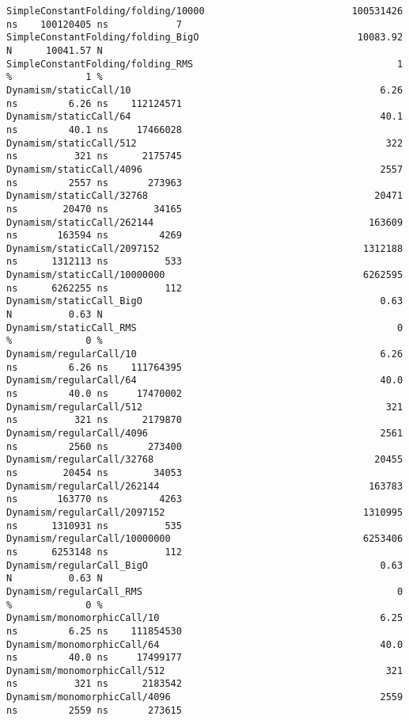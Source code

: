 \begin{code}
\begin{verbatim}
SimpleConstantFolding/folding/10000                          100531426 ns    100120405 ns            7
SimpleConstantFolding/folding_BigO                            10083.92 N      10041.57 N
SimpleConstantFolding/folding_RMS                                    1 %             1 %
Dynamism/staticCall/10                                            6.26 ns         6.26 ns    112124571
Dynamism/staticCall/64                                            40.1 ns         40.1 ns     17466028
Dynamism/staticCall/512                                            322 ns          321 ns      2175745
Dynamism/staticCall/4096                                          2557 ns         2557 ns       273963
Dynamism/staticCall/32768                                        20471 ns        20470 ns        34165
Dynamism/staticCall/262144                                      163609 ns       163594 ns         4269
Dynamism/staticCall/2097152                                    1312188 ns      1312113 ns          533
Dynamism/staticCall/10000000                                   6262595 ns      6262255 ns          112
Dynamism/staticCall_BigO                                          0.63 N          0.63 N
Dynamism/staticCall_RMS                                              0 %             0 %
Dynamism/regularCall/10                                           6.26 ns         6.26 ns    111764395
Dynamism/regularCall/64                                           40.0 ns         40.0 ns     17470002
Dynamism/regularCall/512                                           321 ns          321 ns      2179870
Dynamism/regularCall/4096                                         2561 ns         2560 ns       273400
Dynamism/regularCall/32768                                       20455 ns        20454 ns        34053
Dynamism/regularCall/262144                                     163783 ns       163770 ns         4263
Dynamism/regularCall/2097152                                   1310995 ns      1310931 ns          535
Dynamism/regularCall/10000000                                  6253406 ns      6253148 ns          112
Dynamism/regularCall_BigO                                         0.63 N          0.63 N
Dynamism/regularCall_RMS                                             0 %             0 %
Dynamism/monomorphicCall/10                                       6.25 ns         6.25 ns    111854530
Dynamism/monomorphicCall/64                                       40.0 ns         40.0 ns     17499177
Dynamism/monomorphicCall/512                                       321 ns          321 ns      2183542
Dynamism/monomorphicCall/4096                                     2559 ns         2559 ns       273615

\end{verbatim}
\end{code}
